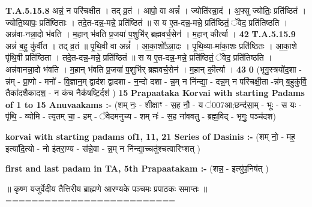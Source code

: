 \documentclass[17pt]{extarticle}
\begin{document}
                  \newline
                                                                  \textbf{ T.A.5.15.8} \newline
                  अन्नं॒ न परि॑चक्षीत । तद् व्र॒तं । आपो॒ वा अन्नं᳚ । ज्योति॑रन्ना॒दं । अ॒फ्सु ज्योतिः॒ प्रति॑ष्ठितं । ज्योति॒ष्यापः॒ प्रति॑ष्ठिताः ।  तदे॒त-दन्न॒-मन्ने॒ प्रति॑ष्ठितं ॥  स य ए॒त-दन्न॒-मन्ने॒ प्रति॑ष्ठितं॒ ॅवेद॒ प्रति॑तिष्ठति । अन्न॑वा-नन्ना॒दो भ॑वति । म॒हान् भ॑वति प्र॒जया॑ प॒शुभि॑र् ब्रह्मवर्च॒सेन॑ ।  म॒हान् कीर्त्या । \textbf{ 42} \newline
                  \newline
                                                                  \textbf{ T.A.5.15.9} \newline
                  अन्नं॑ ब॒हु कु॑र्वीत । तद् व्र॒तं ॥ पृ॒थि॒वी वा अन्नं᳚ । आ॒का॒शो᳚ऽन्ना॒दः । पृ॒थि॒व्या-मा॑का॒शः प्रति॑ष्ठितः । आ॒का॒शे पृ॑थि॒वी प्रति॑ष्ठिता ।  तदे॒त-दन्न॒-मन्ने॒ प्रति॑ष्ठितं ॥  स य ए॒त-दन्न॒-मन्ने॒ प्रति॑ष्ठितं॒ ॅवेद॒ प्रति॑तिष्ठति । अन्न॑वानन्ना॒दो भ॑वति । म॒हान् भ॑वति प्र॒जया॑ प॒शुभि॑र् ब्रह्मवर्च॒सेन॑ ।  म॒हान् की॒र्त्या । \textbf{ 43} \newline
                  \newline
                                                                  \textbf{ } \newline
                   \textbf{ 0} \newline
                  \newline
                                                        (भृगु॒स्त्रयो॑द॒शा - न्न॑म् - प्रा॒णो - मनो॑ - वि॒ज्ञान॒म् द्वाद॑श द्वादशा - न॒न्दो दशा - न्न॒म् न नि॑न्द्या॒ - दन्न॒म् न परि॑चक्षी॒ता -न्न॑म् ब॒हुकु॑र्वि॒ तैका॑दशैकादश॒ - न कंच नैक॑षष्टि॒र्दश॑ ) \textbf{15} \newline \newline
\textbf{Prapaataka Korvai with starting Padams of 1 to 15 Anuvaakams :-} \newline
(शम् नः॒ - शीक्षाꣳ - स॒ह नौ॒ - य ॑007आ;छन्द॑सा॒म् - भूः - स यः - पृ॑थि॒ - व्योमि - त्यृतम् चा॒ - हम् - ॅवेदमनुच्य - शम् नः॑ - स॒ह ना॑ववतु - ब्रह्म॒विद् - भृगुः॒ पञ्च॑दश) \newline

\textbf{korvai with starting padams of1, 11, 21 Series of Dasinis :-} \newline
(शम् नो॒ - मह॒ इत्या॑दि॒त्यो - नो इ॑तरा॒ण्य - स॑न्ने॒वा - न्न॒म् न नि॑न्द्या॒च्चतु॑श्चत्वारिꣳशत् ) \newline

\textbf{first and last padam in TA, 5th Prapaatakam :-} \newline
(शन्न॒ - इत्यु॑प॒निष॑त् ) \newline 


॥ कृष्ण यजुर्वेदीय तैत्तिरीय ब्राह्मणे आरण्यके पञ्चमः प्रपाठकः समाप्तः ॥
========================== \newline
\pagebreak
\pagebreak
        
\end{document}
